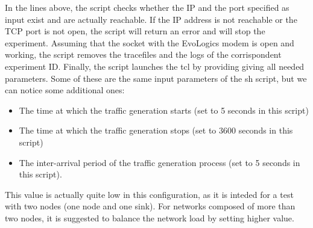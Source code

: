 \documentclass[11pt]{article}
\begin{document}
In the lines above, the script checks whether the IP and the port specified as input exist and are actually reachable. If the IP address is not reachable or the TCP port is not open, the script will return an error and will stop the experiment. 
Assuming that the socket with the EvoLogics modem is open and working, the script removes the tracefiles and the logs of the corrispondent experiment ID. Finally, the script launches the tcl by providing giving all needed parameters. Some of these are the same input parameters of the sh script, but we can notice some additional ones:
\begin{itemize}
\item The time at which the traffic generation starts (set to 5 seconds in this script)
\item The time at which the traffic generation stops (set to 3600 seconds in this script)
\item The inter-arrival period of the traffic generation process (set to 5 seconds in this script).
\end{itemize}
This value is actually quite low in this configuration, as it is inteded for a test with two nodes (one node and one sink). For networks composed of more than two nodes, it is suggested to balance the network load by setting higher value.
\end{document}
